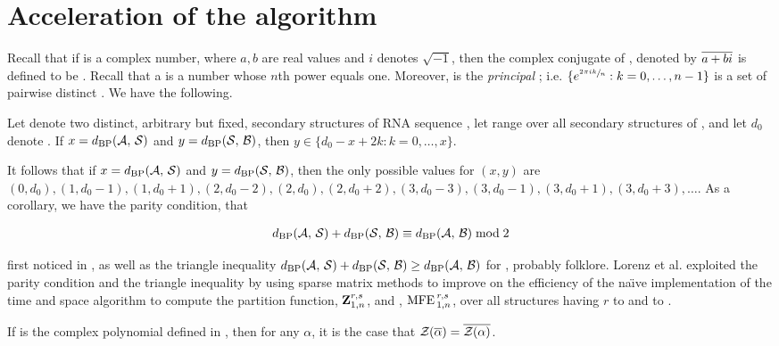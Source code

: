 \section{Acceleration of the \ffttwo algorithm}
\label{sec:ffttwo:perf}

Recall that if \aPbi is a complex number, where $a,b$ are real values and $i$
denotes $\sqrt{-1}$, then the complex conjugate of \aPbi, denoted by
$\overline{a+bi}$ is defined to be \aMbi. Recall that a \nRoU is a number
whose $n$th power equals one. Moreover,
\pRoU is the {\em principal} \nRoU; i.e.
$\{ e^{\sfrac{2 \pi i k}{n}} : k=0,\dots,n-1 \}$ is a set of pairwise distinct
\nRoUs. We have the following.

\begin{lemma}
\label{lem:ffttwo:lemma1}
Let \strAB denote two distinct, arbitrary but fixed,
secondary structures of RNA sequence \seq, let \str range over
all secondary structures of \seq, and let $d_0$ denote \dBP{\strA}{\strB}.
If $x=d_{\text{BP}}(\mathcal A,\,\mathcal S)$ and $y=d_{\text{BP}}(\mathcal S,\,\mathcal B)$, then
$y \in \{ d_0-x+2k: k=0,\dots,x\}$.

It follows that if $x=d_{\text{BP}}(\mathcal A,\,\mathcal S)$ and $y=d_{\text{BP}}(\mathcal S,\,\mathcal B)$,
then the only possible values for
$(x,y)$ are $(0,d_0), (1,d_0-1), (1,d_0+1),
(2,d_0-2), (2,d_0), (2, d_0+2),
(3,d_0-3), (3,d_0-1), (3, d_0+1), (3,d_0+3), \dots$.
As a corollary, we have the parity condition, that

\begin{align}
\label{eq:ffttwo:parity}
\dBP{\strA}{\str} + \dBP{\str}{\strB} \equiv \dBP{\strA}{\strB} \bmod 2
\end{align}

first noticed in \citep{hofacker:RNAbor2D}, as well as
the triangle inequality
$d_{\text{BP}}(\mathcal A,\,\mathcal S) + d_{\text{BP}}(\mathcal S,\,\mathcal B) \geq d_{\text{BP}}(\mathcal A,\,\mathcal B)$
for \bpd, probably folklore.
Lorenz et al. \citep{hofacker:RNAbor2D} exploited the parity condition
and the triangle inequality by using sparse matrix methods to improve on
the efficiency of the na\"{\i}ve implementation of the
 time and  space algorithm to compute
the partition function, ${\bf Z}^{r,s}_{1,n}$,
and \mfes, $\text{MFE\,}^{r,s}_{1,n}$, over all
structures having \bpd $r$ to \strA and \str to \strB.
\end{lemma}

\begin{lemma}
\label{lem:ffttwo:lemma2}
If \fullZx is the complex polynomial defined in
, then for any \nRoU
$\alpha$, it is the case that ${\mathcal Z}_{}(\overline{\alpha}) =
\overline{{\mathcal Z}_{}(\alpha)}$.
\end{lemma}

